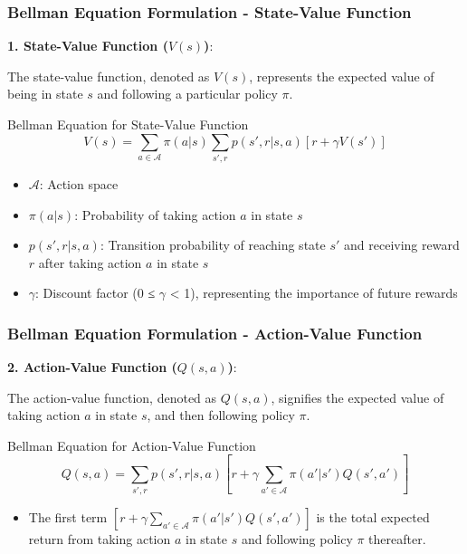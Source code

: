 \documentclass[aspectratio=169]{beamer}
\begin{document}
\begin{frame}[fragile]
  \frametitle{Bellman Equation Formulation - State-Value Function}
  \textbf{1. State-Value Function (\( V(s) \))}:
  
  The state-value function, denoted as \( V(s) \), represents the expected value of being in state \( s \) and following a particular policy \( \pi \).
  
  \begin{block}{Bellman Equation for State-Value Function}
  \begin{equation}
  V(s) = \sum_{a \in \mathcal{A}} \pi(a|s) \sum_{s', r} p(s', r | s, a) [r + \gamma V(s')]
  \end{equation}
  \end{block}
  
  \begin{itemize}
    \item \( \mathcal{A} \): Action space
    \item \( \pi(a|s) \): Probability of taking action \( a \) in state \( s \)
    \item \( p(s', r | s, a) \): Transition probability of reaching state \( s' \) and receiving reward \( r \) after taking action \( a \) in state \( s \)
    \item \( \gamma \): Discount factor (0 ≤ \( \gamma \) < 1), representing the importance of future rewards
  \end{itemize}
\end{frame}

\begin{frame}[fragile]
  \frametitle{Bellman Equation Formulation - Action-Value Function}
  \textbf{2. Action-Value Function (\( Q(s, a) \))}:
  
  The action-value function, denoted as \( Q(s, a) \), signifies the expected value of taking action \( a \) in state \( s \), and then following policy \( \pi \).
  
  \begin{block}{Bellman Equation for Action-Value Function}
  \begin{equation}
  Q(s, a) = \sum_{s', r} p(s', r | s, a) [r + \gamma \sum_{a' \in \mathcal{A}} \pi(a'|s') Q(s', a')]
  \end{equation}
  \end{block}
  
  \begin{itemize}
    \item The first term \( [r + \gamma \sum_{a' \in \mathcal{A}} \pi(a'|s') Q(s', a')] \) is the total expected return from taking action \( a \) in state \( s \) and following policy \( \pi \) thereafter.
  \end{itemize}
\end{frame}
\end{document}

